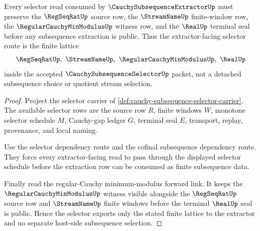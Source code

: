 \begin{theorem}
\label{thm:cauchy-subsequence-selector-orphan-lattice-route}
Every selector read consumed by $\CauchySubsequenceExtractorUp$ must preserve the $\RegSeqRatUp$ source row, the $\StreamNameUp$ finite-window row, the $\RegularCauchyMinModulusUp$ witness row, and the $\RealUp$ terminal seal before any subsequence extraction is public. Thus the extractor-facing selector route is the finite lattice
$$
\RegSeqRatUp,\ \StreamNameUp,\ \RegularCauchyMinModulusUp,\ \RealUp
$$
inside the accepted $\CauchySubsequenceSelectorUp$ packet, not a detached subsequence choice or quotient stream selection.
\end{theorem}
\begin{proof}
Project the selector carrier of \autoref{def:cauchy-subsequence-selector-carrier}. The available selector rows are the source row $R$, finite windows $W$, monotone selector schedule $M$, Cauchy-gap ledger $G$, terminal seal $E$, transport, replay, provenance, and local naming.

Use the selector dependency route and the cofinal subsequence dependency route. They force every extractor-facing read to pass through the displayed selector schedule before the extraction row can be consumed as finite subsequence data.

Finally read the regular-Cauchy minimum-modulus forward link. It keeps the $\RegularCauchyMinModulusUp$ witness visible alongside the $\RegSeqRatUp$ source row and $\StreamNameUp$ finite windows before the terminal $\RealUp$ seal is public. Hence the selector exports only the stated finite lattice to the extractor and no separate host-side subsequence selection.
\end{proof}
